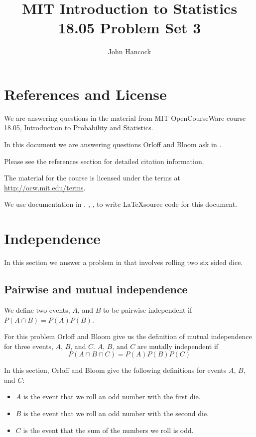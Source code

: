 \documentclass[a4paper,11pt]{article}
\author{John Hancock}
\title{MIT Introduction to Statistics 18.05 Problem Set 3 }
\begin{document}
\maketitle
\tableofcontents
\section{References and License}
We are answering questions in the material from MIT OpenCourseWare
course 18.05, Introduction to Probability and Statistics.

In this document we are answering questions Orloff and Bloom ask in
\cite{probSet3}.

Please see the references section for detailed citation information.

The material for the course is licensed under the terms at
\url{http://ocw.mit.edu/terms}.

We use documentation in \cite{vennDiagram}, \cite{nodePos}, \cite{plotPoints},
\cite{plotFunc} to write \LaTeX source code for this document.
\section{Independence}

In this section we answer a problem in \cite{probSet3} that involves rolling
two six sided dice.

\subsection{Pairwise and mutual independence}
We define two events, $A$, and $B$ to be pairwise independent if
$P \left( A \cap B \right) = P \left( A \right) P \left(B \right)$.

For this problem Orloff and Bloom give us the definition of mutual independence
for three events, $A$, $B$, and $C$.  $A$, $B$, and $C$ are mutally independent
if
\begin{equation}
	P \left( A \cap B \cap C\right)
	= P \left(A \right) P \left(B \right) P \left( C \right)
\end{equation}

In this section, Orloff and Bloom give the following definitions for events
$A$, $B$, and $C$:
\begin{itemize}
	\item $A$ is the event that we roll an odd number with the first die.
	\item $B$ is the event that we roll an odd number with the second die.
	\item $C$ is the event that the sum of the numbers we roll is odd.
\end{itemize}
\end{document}
